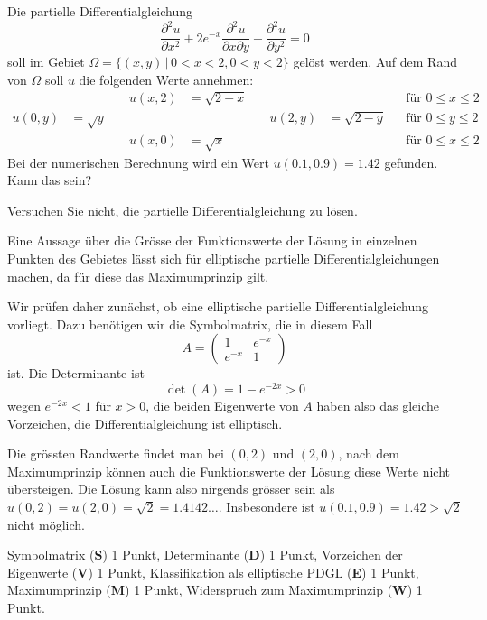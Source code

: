 Die partielle Differentialgleichung
\[
\frac{\partial^2 u}{\partial x^2}
+
2e^{-x}
\frac{\partial^2 u}{\partial x\partial y}
+
\frac{\partial^2 u}{\partial y^2}
=
0
\]
soll im Gebiet $\Omega=\{(x,y)\,|\, 0<x<2, 0<y<2\}$ gelöst werden.
Auf dem Rand von $\Omega$ soll $u$ die folgenden Werte annehmen:
\begin{align*}
      &    &\quad u(x,2)&=\sqrt{2-x}&\quad       &        &&\text{für $0\le x\le 2$}\\
u(0,y)&=\sqrt{y}&\quad       &        &\quad u(2,y)&=\sqrt{2-y}&&\text{für $0\le y\le 2$}\\
      &    &\quad u(x,0)&=\sqrt{x}    &\quad       &        &&\text{für $0\le x\le 2$}
\end{align*}
Bei der numerischen Berechnung wird ein Wert $u(0.1,0.9)=1.42$ gefunden.
Kann das sein?

\begin{hinweis}
Versuchen Sie nicht, die partielle Differentialgleichung zu lösen.
\end{hinweis}

\begin{loesung}
Eine Aussage über die Grösse der Funktionswerte der Lösung in
einzelnen Punkten des Gebietes lässt sich für elliptische
partielle Differentialgleichungen machen, da für diese das Maximumprinzip
gilt.

Wir prüfen daher zunächst, ob eine elliptische partielle
Differentialgleichung vorliegt. Dazu benötigen wir die Symbolmatrix,
die in diesem Fall
\[
A=\begin{pmatrix}
1&e^{-x}\\
e^{-x}&1
\end{pmatrix}
\]
ist. Die Determinante ist
\[
\det(A)=1-e^{-2x}>0
\]
wegen
$e^{-2x}<1$
für $x>0$, die beiden Eigenwerte von $A$ haben also das gleiche Vorzeichen,
die Differentialgleichung ist elliptisch.

Die grössten Randwerte findet man bei $(0,2)$ und $(2,0)$, nach dem
Maximumprinzip
können auch die Funktionswerte der Lösung diese Werte nicht übersteigen.
Die Lösung kann also nirgends grösser sein als
$u(0,2)=u(2,0)=\sqrt{2}=1.4142\dots$.
Insbesondere ist $u(0.1,0.9)=1.42>\sqrt{2}$ nicht möglich.
\end{loesung}

\begin{bewertung}
Symbolmatrix ({\bf S}) 1 Punkt,
Determinante ({\bf D}) 1 Punkt,
Vorzeichen der Eigenwerte ({\bf V}) 1 Punkt,
Klassifikation als elliptische PDGL ({\bf E}) 1 Punkt,
Maximumprinzip ({\bf M}) 1 Punkt,
Widerspruch zum Maximumprinzip ({\bf W}) 1 Punkt.
\end{bewertung}
